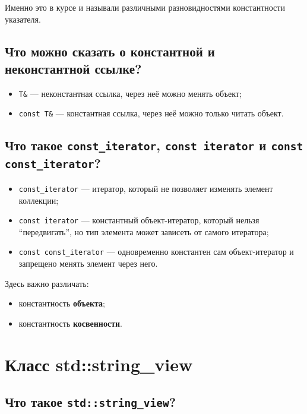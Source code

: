 Именно это в курсе и называли различными разновидностями константности указателя.


\subsection{Что можно сказать о константной и неконстантной ссылке?}

\begin{itemize}
    \item \texttt{T\&} --- неконстантная ссылка, через неё можно менять объект;
    \item \texttt{const T\&} --- константная ссылка, через неё можно только читать объект.
\end{itemize}


\subsection{Что такое \texttt{const\_iterator}, \texttt{const iterator} и \texttt{const const\_iterator}?}

\begin{itemize}
    \item \texttt{const\_iterator} --- итератор, который не позволяет изменять элемент коллекции;
    \item \texttt{const iterator} --- константный объект-итератор, который нельзя ``передвигать'', но тип элемента может зависеть от самого итератора;
    \item \texttt{const const\_iterator} --- одновременно константен сам объект-итератор и запрещено менять элемент через него.
\end{itemize}

Здесь важно различать:
\begin{itemize}
    \item константность \textbf{объекта};
    \item константность \textbf{косвенности}.
\end{itemize}



\section{Класс std::string\_view}

\subsection{Что такое \texttt{std::string\_view}?}

